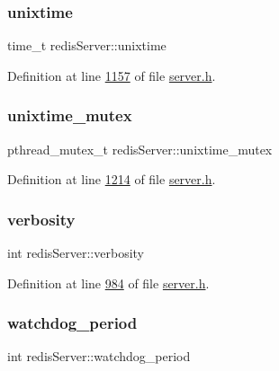 \subsubsection{\texorpdfstring{unixtime}{unixtime}}
{\footnotesize\ttfamily time\+\_\+t redis\+Server\+::unixtime}



Definition at line \hyperlink{server_8h_source_l01157}{1157} of file \hyperlink{server_8h_source}{server.\+h}.

\mbox{\label{structredisServer_a6bd730986b47de7c45cb9f7c35ee7d16}} 
\subsubsection{\texorpdfstring{unixtime\+\_\+mutex}{unixtime\_mutex}}
{\footnotesize\ttfamily pthread\+\_\+mutex\+\_\+t redis\+Server\+::unixtime\+\_\+mutex}



Definition at line \hyperlink{server_8h_source_l01214}{1214} of file \hyperlink{server_8h_source}{server.\+h}.

\mbox{\label{structredisServer_af1160987d1ec93ebcc55dbef59838c92}} 
\subsubsection{\texorpdfstring{verbosity}{verbosity}}
{\footnotesize\ttfamily int redis\+Server\+::verbosity}



Definition at line \hyperlink{server_8h_source_l00984}{984} of file \hyperlink{server_8h_source}{server.\+h}.

\mbox{\label{structredisServer_af66e35b25a5ca0c1239eea8671336de9}} 
\subsubsection{\texorpdfstring{watchdog\+\_\+period}{watchdog\_period}}
{\footnotesize\ttfamily int redis\+Server\+::watchdog\+\_\+period}



